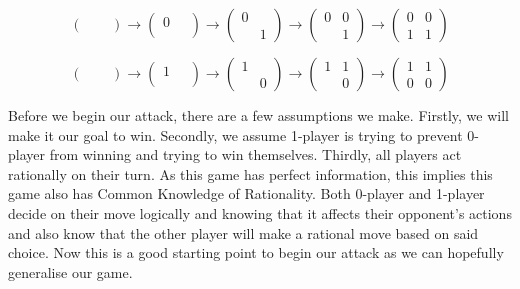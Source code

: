 \documentclass[11pt]{article}
\newcommand{\keywordfont}{\textsc}
\newcommand{\keyword}[1]{%
  \marginpar{\raggedright\small\keywordfont{#1}}}
\begin{document}
\[ \left( \begin{array}{cc}
\ & \ \\
\ & \
\end{array} \right)
\rightarrow
%
\left( \begin{array}{cc}
0 & \ \\
\ & \
\end{array} \right)
\rightarrow
%
\left( \begin{array}{cc}
0 & \ \\
\ & 1
\end{array} \right)
\rightarrow
%
\left( \begin{array}{cc}
0 & 0 \\
\ & 1
\end{array} \right)
\rightarrow
%
\left( \begin{array}{cc}
0 & 0 \\
1 & 1
\end{array} \right)
\]

\[ \left( \begin{array}{cc}
\ & \ \\
\ & \
\end{array} \right)
\rightarrow
%
\left( \begin{array}{cc}
1 & \ \\
\ & \
\end{array} \right)
\rightarrow
%
\left( \begin{array}{cc}
1 & \ \\
\ & 0
\end{array} \right)
\rightarrow
%
\left( \begin{array}{cc}
1 & 1 \\
\ & 0
\end{array} \right)
\rightarrow
%
\left( \begin{array}{cc}
1 & 1 \\
0 & 0
\end{array} \right)
\]

Before we begin our attack, \keyword{Assumptions} there are a few assumptions we make. Firstly, we will make it our goal to win. Secondly, we assume 1-player is trying to prevent 0-player from winning and trying to win themselves. Thirdly, all players act rationally on their turn. As this game has perfect information, this implies this game also has Common Knowledge of Rationality. Both 0-player and 1-player decide on their move logically and knowing that it affects their opponent's actions and also know that the other player will make a rational move based on said choice. Now this is a good starting point to begin our attack as we can hopefully generalise our game.
\end{document}
